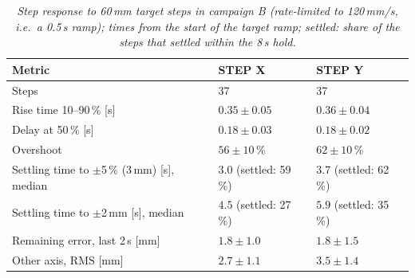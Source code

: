 \begin{table}[H]
\centering
\begin{tabularx}{\textwidth}{|X|l|l|}
\hline
\textbf{Metric} & \textbf{STEP X} & \textbf{STEP Y} \\ \hline
Steps & 37 & 37 \\ \hline
Rise time 10--90\,\% [s] & $0.35 \pm 0.05$ & $0.36 \pm 0.04$ \\ \hline
Delay at 50\,\% [s] & $0.18 \pm 0.03$ & $0.18 \pm 0.02$ \\ \hline
Overshoot & $56 \pm 10$\,\% & $62 \pm 10$\,\% \\ \hline
Settling time to $\pm$5\,\% (3\,mm) [s], median & $3.0$ (settled: 59\,\%) & $3.7$ (settled: 62\,\%) \\ \hline
Settling time to $\pm$2\,mm [s], median & $4.5$ (settled: 27\,\%) & $5.9$ (settled: 35\,\%) \\ \hline
Remaining error, last 2\,s [mm] & $1.8 \pm 1.0$ & $1.8 \pm 1.5$ \\ \hline
Other axis, RMS [mm] & $2.7 \pm 1.1$ & $3.5 \pm 1.4$ \\ \hline
\end{tabularx}
\caption{\textit{Step response to 60\,mm target steps in campaign B (rate-limited to 120\,mm/s, i.e.\ a 0.5\,s ramp); times from the start of the target ramp; settled: share of the steps that settled within the 8\,s hold.}}
\label{tab:test_steps}
\end{table}
